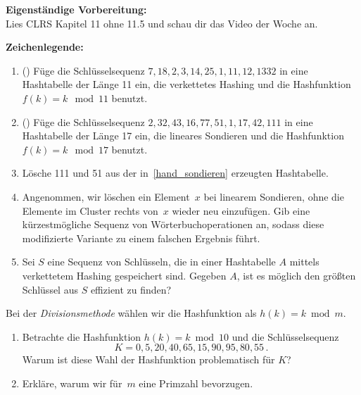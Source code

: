 \documentclass{uebung_cs}
\begin{document}
\textbf{Eigenständige Vorbereitung:}\\
Lies  CLRS Kapitel 11 ohne 11.5 und schau dir das  Video der Woche an.

\textbf{Zeichenlegende:}
\legende{}


\begin{aufgabe}\label{tue-first}\mbox{}
	\begin{enumerate}
		\item (\warmup) Füge die Schlüsselsequenz $7, 18, 2, 3, 14, 25, 1, 11, 12, 1332$ in eine Hashtabelle der Länge 11 ein, die verkettetes Hashing und die Hashfunktion $f(k) = k \mod 11$ benutzt.
		\item\label{hand_sondieren} (\warmup) Füge die Schlüsselsequenz $2, 32, 43, 16, 77, 51, 1, 17, 42, 111$ in eine Hashtabelle der Länge 17 ein, die lineares Sondieren und die Hashfunktion $f(k) = k \mod 17$ benutzt.
		\item Lösche 111 und 51 aus der in~\ref{hand_sondieren} erzeugten Hashtabelle.
		\item\label{wrong_delete} Angenommen, wir löschen ein Element~$x$ bei linearem Sondieren, ohne die Elemente im Cluster rechts von~$x$ wieder neu einzufügen.
		Gib eine kürzestmögliche Sequenz von Wörterbuchoperationen an, sodass diese modifizierte Variante zu einem falschen Ergebnis führt.
		\item Sei $S$ eine Sequenz von Schlüsseln, die in einer Hashtabelle $A$ mittels verkettetem Hashing gespeichert sind.
		Gegeben $A$, ist es möglich den größten Schlüssel aus $S$ effizient zu finden?
	\end{enumerate}
\end{aufgabe}

\begin{aufgabe}
	Bei der \emph{Divisionsmethode} wählen wir die Hashfunktion als $h(k)=k\bmod m$.
	\begin{enumerate}
		\item Betrachte die Hashfunktion $h(k) = k \bmod 10$ und die Schlüsselsequenz \[K = 0, 5, 20, 40, 65, 15, 90, 95, 80, 55\,.\] Warum ist diese Wahl der Hashfunktion problematisch für $K$?
		\item Erkläre, warum wir für~$m$ eine Primzahl bevorzugen.
	\end{enumerate}
\end{aufgabe}
\end{document}
